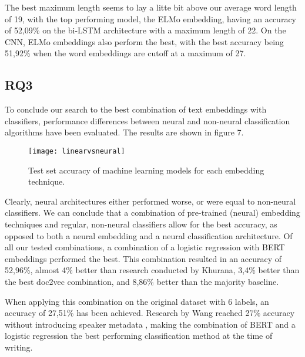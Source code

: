 The best maximum length seems to lay a litte bit above our average word length of 19, with the top performing model, the ELMo embedding, having an accuracy of 52,09\% on the bi-LSTM architecture with a maximum length of 22.
On the CNN, ELMo embeddings also perform the best, with the best accuracy being 51,92\% when the word embeddings are cutoff at a maximum of 27. 

\subsection{RQ3}
To conclude our search to the best combination of text embeddings with classifiers, performance differences between neural and non-neural classification algorithms have been evaluated.
The results are shown in figure 7. 

\begin{figure}[h]
    \centering
    \texttt{[image: linearvsneural]}
    \caption{Test set accuracy of machine learning models for each embedding technique.}
\end{figure}

Clearly, neural architectures either performed worse, or were equal to non-neural classifiers. 
We can conclude that a combination of pre-trained (neural) embedding techniques and regular, non-neural classifiers allow for the best accuracy, as opposed to both a neural embedding and a neural classification architecture.
Of all our tested combinations, a combination of a logistic regression with BERT embeddings performed the best. 
This combination resulted in an accuracy of 52,96\%, almost 4\% better than research conducted by Khurana, 3,4\% better than the best doc2vec combination, and 8,86\% better than the majority baseline.

When applying this combination on the original dataset with 6 labels, an accuracy of 27,51\% has been achieved. 
Research by Wang reached 27\% accuracy without introducing speaker metadata \cite{wang2018}, making the combination of BERT and a logistic regression the best performing classification method at the time of writing.